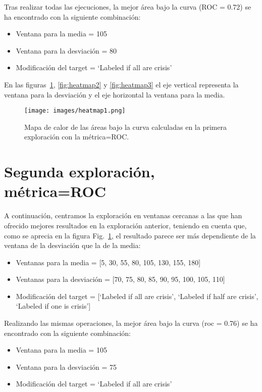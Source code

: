 \documentclass[a4paper,12pt,twoside,oldfontcommands]{memoir}
\begin{document}
	Tras realizar todas las ejecuciones, la mejor área bajo la curva (ROC = 0.72) se ha encontrado con la siguiente combinación: 
	\begin{itemize}
		\item Ventana para la media = 105
		\item Ventana para la desviación = 80
		\item Modificación del target = `Labeled if all are crisis'
	\end{itemize}
	
	En las figuras~\ref{fig:heatmap1}, \ref{fig:heatmap2} y \ref{fig:heatmap3} el eje vertical representa la ventana para la desviación y el eje horizontal la ventana para la media. 
	
	\begin{figure}
		\centering
		\texttt{[image: images/heatmap1.png]}
		\caption{Mapa de calor de las áreas bajo la curva calculadas en la primera exploración con la métrica=ROC.}
		\label{fig:heatmap1}
	\end{figure}
	
	\section{Segunda exploración, métrica=ROC}
	
	A continuación, centramos la exploración en ventanas cercanas a las que han ofrecido mejores resultados en la exploración anterior, teniendo en cuenta que, como se aprecia en la figura Fig.~\ref{fig:heatmap1}, el resultado parece ser más dependiente de la ventana de la desviación que la de la media: 
	\begin{itemize}
		\item Ventanas para la media = [5, 30, 55, 80, 105, 130, 155, 180]
		\item Ventanas para la desviación = [70, 75, 80, 85, 90, 95, 100, 105, 110]
		\item Modificación del target = [`Labeled if all are crisis', `Labeled if half are crisis', `Labeled if one is crisis']
	\end{itemize}
	
	Realizando las mismas operaciones, la mejor área bajo la curva (roc = 0.76) se ha encontrado con la siguiente combinación: 
	\begin{itemize}
		\item Ventana para la media = 105
		\item Ventana para la desviación = 75
		\item Modificación del target = `Labeled if all are crisis'
	\end{itemize}
	
\end{document}
